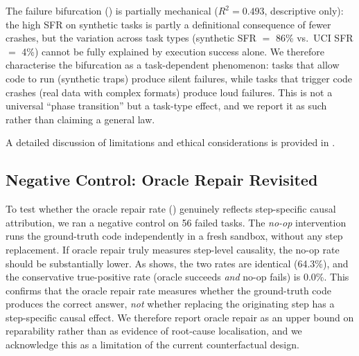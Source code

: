 The failure bifurcation () is partially mechanical ($R^2 = 0.493$, descriptive only): the high SFR on synthetic tasks is partly a definitional consequence of fewer crashes, but the variation across task types (synthetic SFR $=$ 86\% vs.\ UCI SFR $=$ 4\%) cannot be fully explained by execution success alone. We therefore characterise the bifurcation as a task-dependent phenomenon: tasks that allow code to run (synthetic traps) produce silent failures, while tasks that trigger code crashes (real data with complex formats) produce loud failures. This is not a universal ``phase transition'' but a task-type effect, and we report it as such rather than claiming a general law.

A detailed discussion of limitations and ethical considerations is provided in .

\subsection{Negative Control: Oracle Repair Revisited}
\label{sec:disc-negative-control}

To test whether the oracle repair rate () genuinely reflects step-specific causal attribution, we ran a negative control on 56 failed tasks. The \emph{no-op} intervention runs the ground-truth code independently in a fresh sandbox, without any step replacement. If oracle repair truly measures step-level causality, the no-op rate should be substantially lower. As  shows, the two rates are identical (64.3\%), and the conservative true-positive rate (oracle succeeds \emph{and} no-op fails) is 0.0\%. This confirms that the oracle repair rate measures whether the ground-truth code produces the correct answer, \emph{not} whether replacing the originating step has a step-specific causal effect. We therefore report oracle repair as an upper bound on reparability rather than as evidence of root-cause localisation, and we acknowledge this as a limitation of the current counterfactual design.


